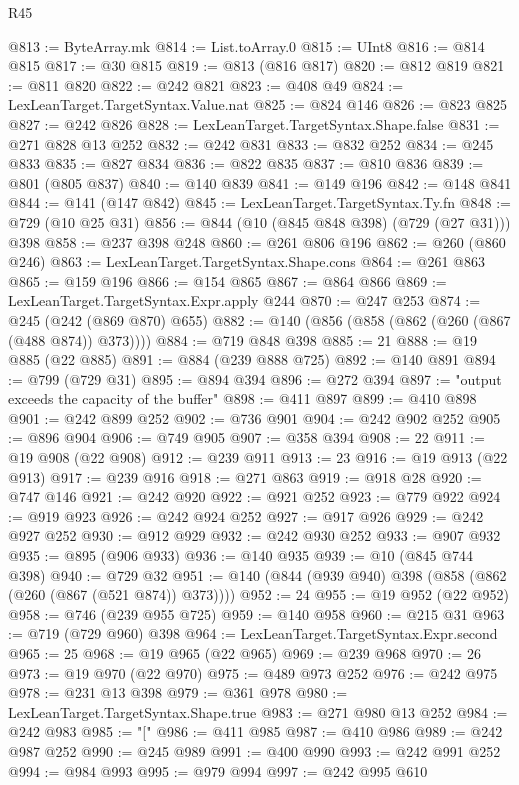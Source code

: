 \begin{lexlean}{R45}
\begin{coremodule}
@813 := ByteArray.mk
@814 := List.toArray.{0}
@815 := UInt8
@816 := @814 @815
@817 := @30 @815
@819 := @813 (@816 @817)
@820 := @812 @819
@821 := @811 @820
@822 := @242 @821
@823 := @408 @49
@824 := LexLeanTarget.TargetSyntax.Value.nat
@825 := @824 @146
@826 := @823 @825
@827 := @242 @826
@828 := LexLeanTarget.TargetSyntax.Shape.false
@831 := @271 @828 @13 @252
@832 := @242 @831
@833 := @832 @252
@834 := @245 @833
@835 := @827 @834
@836 := @822 @835
@837 := @810 @836
@839 := @801 (@805 @837)
@840 := @140 @839
@841 := @149 @196
@842 := @148 @841
@844 := @141 (@147 @842)
@845 := LexLeanTarget.TargetSyntax.Ty.fn
@848 := @729 (@10 @25 @31)
@856 := @844 (@10 (@845 @848 @398) (@729 (@27 @31))) @398
@858 := @237 @398 @248
@860 := @261 @806 @196
@862 := @260 (@860 @246)
@863 := LexLeanTarget.TargetSyntax.Shape.cons
@864 := @261 @863
@865 := @159 @196
@866 := @154 @865
@867 := @864 @866
@869 := LexLeanTarget.TargetSyntax.Expr.apply @244
@870 := @247 @253
@874 := @245 (@242 (@869 @870) @655)
@882 := @140 (@856 (@858 (@862 (@260 (@867 (@488 @874)) @373))))
@884 := @719 @848 @398
@885 := 21
@888 := @19 @885 (@22 @885)
@891 := @884 (@239 @888 @725)
@892 := @140 @891
@894 := @799 (@729 @31)
@895 := @894 @394
@896 := @272 @394
@897 := "output exceeds the capacity of the buffer"
@898 := @411 @897
@899 := @410 @898
@901 := @242 @899 @252
@902 := @736 @901
@904 := @242 @902 @252
@905 := @896 @904
@906 := @749 @905
@907 := @358 @394
@908 := 22
@911 := @19 @908 (@22 @908)
@912 := @239 @911
@913 := 23
@916 := @19 @913 (@22 @913)
@917 := @239 @916
@918 := @271 @863
@919 := @918 @28
@920 := @747 @146
@921 := @242 @920
@922 := @921 @252
@923 := @779 @922
@924 := @919 @923
@926 := @242 @924 @252
@927 := @917 @926
@929 := @242 @927 @252
@930 := @912 @929
@932 := @242 @930 @252
@933 := @907 @932
@935 := @895 (@906 @933)
@936 := @140 @935
@939 := @10 (@845 @744 @398)
@940 := @729 @32
@951 := @140 (@844 (@939 @940) @398 (@858 (@862 (@260 (@867 (@521 @874)) @373))))
@952 := 24
@955 := @19 @952 (@22 @952)
@958 := @746 (@239 @955 @725)
@959 := @140 @958
@960 := @215 @31
@963 := @719 (@729 @960) @398
@964 := LexLeanTarget.TargetSyntax.Expr.second
@965 := 25
@968 := @19 @965 (@22 @965)
@969 := @239 @968
@970 := 26
@973 := @19 @970 (@22 @970)
@975 := @489 @973 @252
@976 := @242 @975
@978 := @231 @13 @398
@979 := @361 @978
@980 := LexLeanTarget.TargetSyntax.Shape.true
@983 := @271 @980 @13 @252
@984 := @242 @983
@985 := "["
@986 := @411 @985
@987 := @410 @986
@989 := @242 @987 @252
@990 := @245 @989
@991 := @400 @990
@993 := @242 @991 @252
@994 := @984 @993
@995 := @979 @994
@997 := @242 @995 @610

\end{coremodule}
\end{lexlean}
